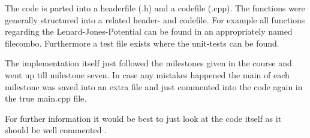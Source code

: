 The code is parted into a headerfile (.h) and a codefile (.cpp). The functions were generally structured into a related header- and codefile. For example all functions regarding the Lenard-Jones-Potential can be found in an appropriately named filecombo. Furthermore a test file exists where the unit-tests can be found.
\par
The implementation itself just followed the milestones given in the course and went up till milestone seven. 
In case any mistakes happened the main of each milestone was saved into an extra file and just commented into the code again in the true main.cpp file. 
\par
For further information it would be best to just look at the code itself as it should be well commented \cite{molDymGithub}.




